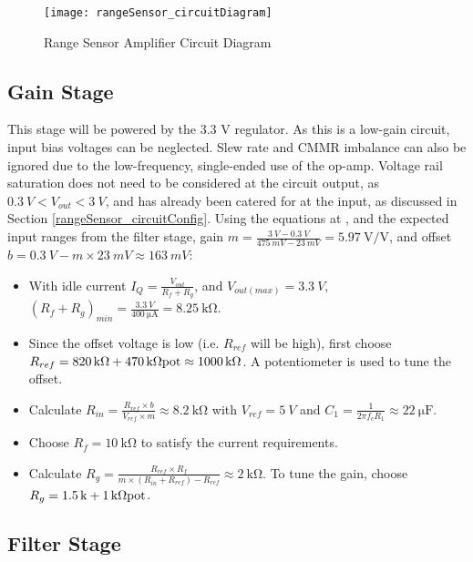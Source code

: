 \begin{figure}[!htb]
  \centering
  \texttt{[image: rangeSensor\_circuitDiagram]}
  \caption{Range Sensor Amplifier Circuit Diagram}
  \label{fig:rangeSensor_circuitDiagram}
\end{figure}

\subsection{Gain Stage}

This stage will be powered by the 3.3 V regulator. As this is a low-gain circuit, input bias voltages can be neglected.
Slew rate and CMMR imbalance can also be ignored due to the low-frequency, single-ended use of the op-amp.
Voltage rail saturation does not need to be considered at the circuit output, as $\SI{0.3}{V} < V_{out} < \SI{3}{V}$,
and has already been catered for at the input, as discussed in Section \ref{rangeSensor_circuitConfig}.
Using the equations at \cite{gainOffset30Seconds}, and the expected input ranges from the filter stage,
gain $m = \frac{\SI{3}{V} - \SI{0.3}{V}}{\SI{475}{mV} - \SI{23}{mV}} = \SI{5.97}{\volt\per\volt}$,
and offset $b = \SI{0.3}{V} - m \times \SI{23}{mV} \approx \SI{163}{mV}$:

\begin{itemize}
  \item With idle current $I_Q = \frac{V_{out}}{R_f + R_g}$, and $V_{out(max)} = \SI{3.3}{V}$, $(R_f + R_g)_{min} = \frac{\SI{3.3}{V}}{\SI{400}{\micro\ampere}} = \SI{8.25}{\kilo\ohm}$.
  \item Since the offset voltage is low (i.e. $R_{ref}$ will be high), first choose $R_{ref} = \SI{820}{\kilo\ohm} + \SI{470}{\kilo\ohm} \textnormal{pot} \approx \SI{1000}{\kilo\ohm}$.
        A potentiometer is used to tune the offset.
  \item Calculate $R_{in} = \frac{R_{ref} \times b}{V_{ref} \times m} \approx \SI{8.2}{\kilo\ohm}$ with $V_{ref} = \SI{5}{V}$ and $C_1 = \frac{1}{2 \pi f_c R_1} \approx \SI{22}{\micro\farad}$.
  \item Choose $R_f = \SI{10}{\kilo\ohm}$ to satisfy the current requirements.
  \item Calculate $R_g = \frac{R_{ref} \times R_f}{m \times (R_{in} + R_{ref}) - R_{ref}} \approx \SI{2}{\kilo\ohm}$. To tune the gain, choose $R_g = \SI{1.5}{k} + \SI{1}{\kilo\ohm}\textnormal{pot}$.
\end{itemize}


\subsection{Filter Stage}

